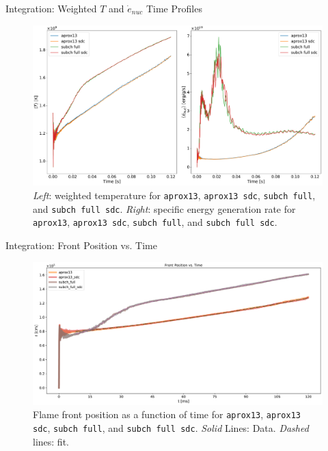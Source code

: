 \documentclass[
	11pt, %
]{beamer}
\begin{document}
\begin{frame}{Integration: Weighted $T$ and $\dot{e}_{nuc}$ Time Profiles}
    
    \begin{figure}
        \centering
        \includegraphics[width=0.95\linewidth]{integration_time_profile.pdf}
        \caption{\scriptsize {\it Left}: weighted temperature for {\tt aprox13}, {\tt aprox13 sdc}, {\tt subch full}, and {\tt subch full sdc}. {\it Right}: specific energy generation rate for {\tt aprox13}, {\tt aprox13 sdc}, {\tt subch full}, and {\tt subch full sdc}.}
    \end{figure}
\end{frame}


\begin{frame}{Integration: Front Position vs. Time}
    
    \begin{figure}
        \centering
        \includegraphics[width=1\linewidth]{integration_front.pdf}
        \caption{Flame front position as a function of time for {\tt aprox13}, {\tt aprox13 sdc}, {\tt subch full}, and {\tt subch full sdc}. {\it Solid} Lines: Data. {\it Dashed} lines: fit.}
    \end{figure}
\end{frame}
\end{document}

